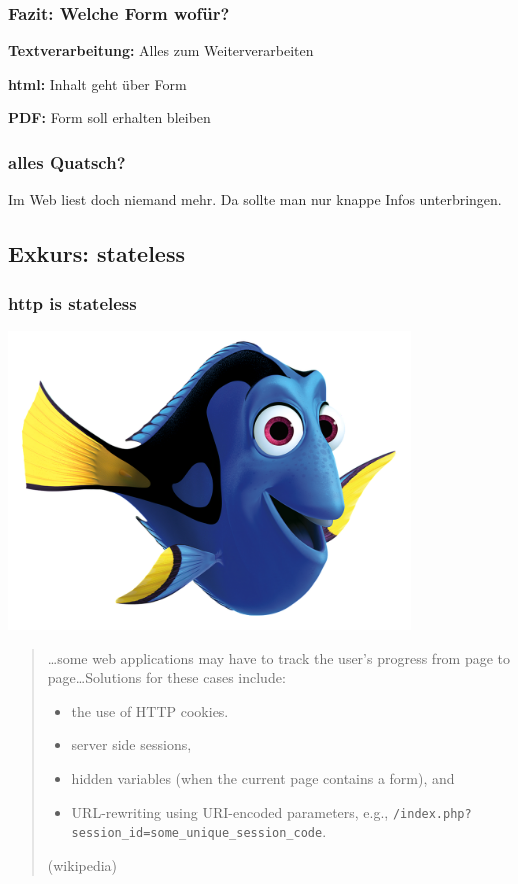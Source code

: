 \begin{frame}
\frametitle{Fazit: Welche Form wofür?}
    \textbf{Textverarbeitung:} Alles zum Weiterverarbeiten

    \textbf{html:} Inhalt geht über Form

    \textbf{PDF:} Form soll erhalten bleiben
\end{frame}

\begin{frame}
\frametitle{alles Quatsch?}
\begin{theorem}
  Im Web liest doch niemand mehr. Da sollte man nur knappe Infos unterbringen.
\end{theorem}
\end{frame}

\subsection{Exkurs: stateless}
\begin{frame}
\frametitle{http is stateless}
  \includegraphics[width=0.8\textwidth]{pics/whatsyournameagain}
\end{frame}

\begin{frame}[fragile]
  \begin{quote}
    \ldots some web applications may have to track the user's progress from page to page\ldots Solutions for these cases include:
    \begin{itemize}
      \item the use of HTTP cookies.
      \item server side sessions,
      \item hidden variables (when the current page contains a form), and
      \item URL-rewriting using URI-encoded parameters, e.g., \lstinline{/index.php?session_id=some_unique_session_code}.
    \end{itemize}
    \hfill(wikipedia)
  \end{quote}
\end{frame}

